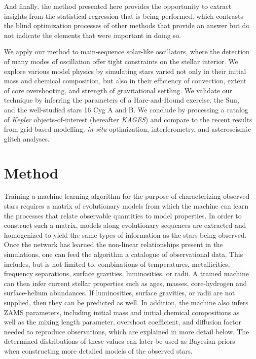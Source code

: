 \documentclass[manuscript]{aastex}
\begin{document}
And finally, the method presented here provides the opportunity to extract insights from the statistical regression that is being performed, which contrasts the blind optimization processes of other methods that provide an answer but do not indicate the elements that were important in doing so. 

We apply our method to main-sequence solar-like oscillators, where the detection of many modes of oscillation  offer tight constraints on the stellar interior. We explore various model physics by simulating stars varied not only in their initial mass and chemical composition, but also in their efficiency of convection, extent of core overshooting, and strength of gravitational settling. We validate our technique by inferring the parameters of a Hare-and-Hound exercise, the Sun, and the well-studied stars 16 Cyg A and B. %
We conclude by processing a catalog of \emph{Kepler} objects-of-interest (hereafter \emph{KAGES}) and compare to the recent results from grid-based modelling, \emph{in-situ} optimization, interferometry, and asteroseismic glitch analyses. 


\section{Method} \label{sec:Method} 
Training a machine learning algorithm for the purpose of characterizing observed stars requires a matrix of evolutionary models from which the machine can learn the processes that relate observable quantities to model properties. In order to construct such a matrix, models along evolutionary sequences are extracted and homogenized to yield the same types of information as the stars being observed. Once the network has learned the non-linear relationships present in the simulations, one can feed the algorithm a catalogue of observational data. This includes, but is not limited to, combinations of 
temperatures, metallicities, frequency separations, surface gravities, luminosities, or radii. %
A trained machine can then infer current stellar properties such as ages, masses, core-hydrogen and surface-helium abundances. If luminosities, surface gravities, or radii are not supplied, then they can be predicted as well. In addition, the machine also infers ZAMS parameters, including initial mass and initial chemical compositions as well as the mixing length parameter, overshoot coefficient, and diffusion factor needed to reproduce observations, which are explained in more detail below. The determined distributions of these values can later be used as Bayesian priors when constructing more detailed models of the observed stars. 
\end{document}
